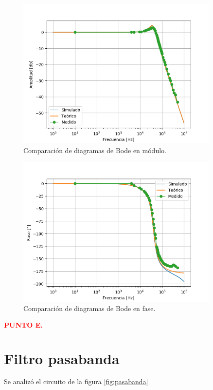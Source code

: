 \begin{figure}[H]
	\centering
	\includegraphics[width=0.9\textwidth]{Ejercicio2/Mediciones/Modulo.png}
\caption{Comparación de diagramas de Bode en módulo.}
	\label{fig:bodemod}
\end{figure}
\begin{figure}[H]
	\centering
	\includegraphics[width=0.9\textwidth]{Ejercicio2/Mediciones/Fase.png}
\caption{Comparación de diagramas de Bode en fase.}
	\label{fig:bodefase}
\end{figure}

\begin{center}
	\textcolor{red}{\textbf{PUNTO E.}}
\end{center}
\section{Filtro pasabanda}
Se analizó el circuito de la figura \ref{fig:pasabanda}

